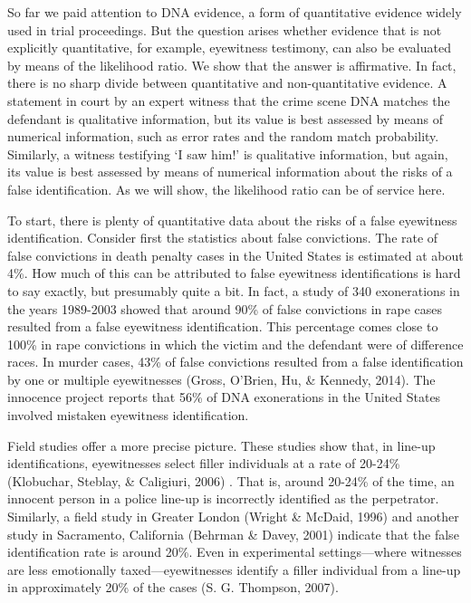 \documentclass[
  10pt,
  dvipsnames,enabledeprecatedfontcommands]{scrartcl}
\begin{document}
So far we paid attention to DNA evidence, a form of quantitative
evidence widely used in trial proceedings. But the question arises
whether evidence that is not explicitly quantitative, for example,
eyewitness testimony, can also be evaluated by means of the likelihood
ratio. We show that the answer is affirmative. In fact, there is no
sharp divide between quantitative and non-quantitative evidence. A
statement in court by an expert witness that the crime scene DNA matches
the defendant is qualitative information, but its value is best assessed
by means of numerical information, such as error rates and the random
match probability. Similarly, a witness testifying `I saw him!' is
qualitative information, but again, its value is best assessed by means
of numerical information about the risks of a false identification. As
we will show, the likelihood ratio can be of service here.

To start, there is plenty of quantitative data about the risks of a
false eyewitness identification. Consider first the statistics about
false convictions. The rate of false convictions in death penalty cases
in the United States is estimated at about 4\%. How much of this can be
attributed to false eyewitness identifications is hard to say exactly,
but presumably quite a bit. In fact, a study of 340 exonerations in the
years 1989-2003 showed that around 90\% of false convictions in rape
cases resulted from a false eyewitness identification. This percentage
comes close to 100\% in rape convictions in which the victim and the
defendant were of difference races. In murder cases, 43\% of false
convictions resulted from a false identification by one or multiple
eyewitnesses (Gross, O'Brien, Hu, \& Kennedy, 2014). The innocence
project reports that 56\% of DNA exonerations in the United States
involved mistaken eyewitness identification.

Field studies offer a more precise picture. These studies show that, in
line-up identifications, eyewitnesses select filler individuals at a
rate of 20-24\% (Klobuchar, Steblay, \& Caligiuri, 2006) . That is,
around 20-24\% of the time, an innocent person in a police line-up is
incorrectly identified as the perpetrator. Similarly, a field study in
Greater London (Wright \& McDaid, 1996) and another study in Sacramento,
California (Behrman \& Davey, 2001) indicate that the false
identification rate is around 20\%. Even in experimental
settings---where witnesses are less emotionally taxed---eyewitnesses
identify a filler individual from a line-up in approximately 20\% of the
cases (S. G. Thompson, 2007).
\end{document}

